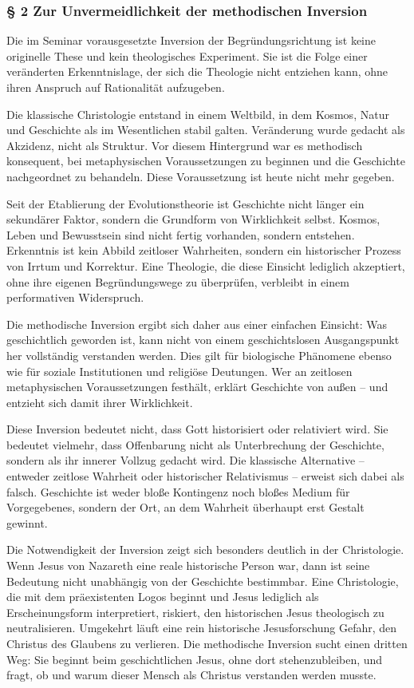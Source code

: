 \documentclass[
  ngerman,
]{article}
\begin{document}
\subsubsection{§ 2 Zur Unvermeidlichkeit der methodischen
Inversion}\label{zur-unvermeidlichkeit-der-methodischen-inversion}

Die im Seminar vorausgesetzte Inversion der Begründungsrichtung ist
keine originelle These und kein theologisches Experiment. Sie ist die
Folge einer veränderten Erkenntnislage, der sich die Theologie nicht
entziehen kann, ohne ihren Anspruch auf Rationalität aufzugeben.

Die klassische Christologie entstand in einem Weltbild, in dem Kosmos,
Natur und Geschichte als im Wesentlichen stabil galten. Veränderung
wurde gedacht als Akzidenz, nicht als Struktur. Vor diesem Hintergrund
war es methodisch konsequent, bei metaphysischen Voraussetzungen zu
beginnen und die Geschichte nachgeordnet zu behandeln. Diese
Voraussetzung ist heute nicht mehr gegeben.

Seit der Etablierung der Evolutionstheorie ist Geschichte nicht länger
ein sekundärer Faktor, sondern die Grundform von Wirklichkeit selbst.
Kosmos, Leben und Bewusstsein sind nicht fertig vorhanden, sondern
entstehen. Erkenntnis ist kein Abbild zeitloser Wahrheiten, sondern ein
historischer Prozess von Irrtum und Korrektur. Eine Theologie, die diese
Einsicht lediglich akzeptiert, ohne ihre eigenen Begründungswege zu
überprüfen, verbleibt in einem performativen Widerspruch.

Die methodische Inversion ergibt sich daher aus einer einfachen
Einsicht: Was geschichtlich geworden ist, kann nicht von einem
geschichtslosen Ausgangspunkt her vollständig verstanden werden. Dies
gilt für biologische Phänomene ebenso wie für soziale Institutionen und
religiöse Deutungen. Wer an zeitlosen metaphysischen Voraussetzungen
festhält, erklärt Geschichte von außen -- und entzieht sich damit ihrer
Wirklichkeit.

Diese Inversion bedeutet nicht, dass Gott historisiert oder relativiert
wird. Sie bedeutet vielmehr, dass Offenbarung nicht als Unterbrechung
der Geschichte, sondern als ihr innerer Vollzug gedacht wird. Die
klassische Alternative -- entweder zeitlose Wahrheit oder historischer
Relativismus -- erweist sich dabei als falsch. Geschichte ist weder
bloße Kontingenz noch bloßes Medium für Vorgegebenes, sondern der Ort,
an dem Wahrheit überhaupt erst Gestalt gewinnt.

Die Notwendigkeit der Inversion zeigt sich besonders deutlich in der
Christologie. Wenn Jesus von Nazareth eine reale historische Person war,
dann ist seine Bedeutung nicht unabhängig von der Geschichte bestimmbar.
Eine Christologie, die mit dem präexistenten Logos beginnt und Jesus
lediglich als Erscheinungsform interpretiert, riskiert, den historischen
Jesus theologisch zu neutralisieren. Umgekehrt läuft eine rein
historische Jesusforschung Gefahr, den Christus des Glaubens zu
verlieren. Die methodische Inversion sucht einen dritten Weg: Sie
beginnt beim geschichtlichen Jesus, ohne dort stehenzubleiben, und
fragt, ob und warum dieser Mensch als Christus verstanden werden musste.
\end{document}
